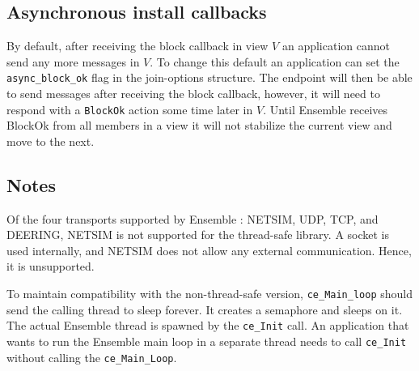 \subsection{Asynchronous install callbacks}
By default, after receiving the block callback in view $V$ an application cannot
send any more messages in $V$. To change this default an application
can set the {\tt async\_block\_ok} flag in the join-options
structure. The endpoint will then be able to send messages after
receiving the block callback, however, it will need to respond with a
{\tt BlockOk} action some time later in $V$. Until Ensemble receives BlockOk
from all members in a view it will not stabilize the current view and
move to the next. 

\subsection{Notes}
Of the four transports supported by Ensemble : NETSIM, UDP, TCP, and
DEERING, NETSIM is not supported for the thread-safe library. A socket
is used internally, and NETSIM does not allow any
external communication. Hence, it is unsupported.

To maintain compatibility with the non-thread-safe version,
{\tt ce\_Main\_loop} should send the calling thread to sleep forever. It
creates a semaphore and sleeps on it. The actual Ensemble thread is
spawned by the {\tt ce\_Init} call. An application that wants to run
the Ensemble main loop in a separate thread needs to call
{\tt ce\_Init} without calling the {\tt ce\_Main\_Loop}.




